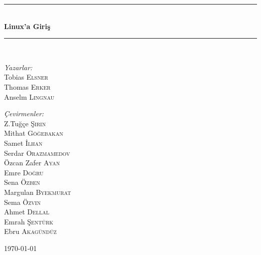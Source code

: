 \documentclass[10pt,a5paper]{book}
\newcommand{\HRule}{\rule{\linewidth}{0.5mm}}
\begin{document}
\begin{titlepage}
\begin{center}
\HRule \\[1.5cm]
{ \huge \bfseries Linux'a Giriş}\\[1.5cm]
\HRule \\[1.5cm]

\begin{minipage}{0.4\textwidth}
\begin{flushleft} \large
\emph{Yazarlar:}\\
Tobias \textsc{Elsner}\\
Thomas \textsc{Erker}\\
Anselm \textsc{Lingnau}
\end{flushleft}
\end{minipage}
\begin{minipage}{0.4\textwidth}
\begin{flushright} \large
\emph{Çevirmenler:} \\
Z.Tuğçe \textsc{Şirin}\\
Mithat \textsc{Göğebakan}\\
Samet \textsc{İlhan}\\
Serdar \textsc{Orazmamedov}\\
Özcan Zafer \textsc{Ayan}\\
Emre \textsc{Doğru}\\
Sena \textsc{Özben}\\
Margulan \textsc{Byekmurat}\\
Sema \textsc{Özvin}\\
Ahmet \textsc{Dellal}\\
Emrah \textsc{Şentürk}\\
Ebru \textsc{Akagündüz}
\end{flushright}
\end{minipage}
\vfill
{\large \today}

\end{center}

\end{titlepage}

\tableofcontents
\listoftables
















\end{document}
